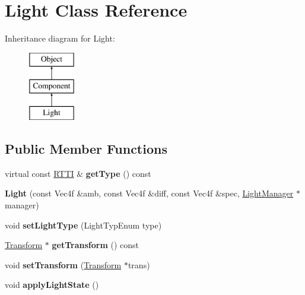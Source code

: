 \hypertarget{class_light}{
\section{Light Class Reference}
\label{class_light}
}
Inheritance diagram for Light:\begin{figure}[H]
\begin{center}
\leavevmode
\includegraphics[height=3.000000cm]{class_light}
\end{center}
\end{figure}
\subsection*{Public Member Functions}
\begin{DoxyCompactItemize}
\item 
\hypertarget{class_light_a5404d9b1ee53f91da443c061b98a8f66}{
virtual const \hyperlink{class_r_t_t_i}{RTTI} \& {\bfseries getType} () const }
\label{class_light_a5404d9b1ee53f91da443c061b98a8f66}

\item 
\hypertarget{class_light_af5c65ad5f3237bea9f6f469eb95a66a1}{
{\bfseries Light} (const Vec4f \&amb, const Vec4f \&diff, const Vec4f \&spec, \hyperlink{class_light_manager}{LightManager} $\ast$manager)}
\label{class_light_af5c65ad5f3237bea9f6f469eb95a66a1}

\item 
\hypertarget{class_light_a45f84b6f75a0d02760d3a20efaf8f83e}{
void {\bfseries setLightType} (LightTypEnum type)}
\label{class_light_a45f84b6f75a0d02760d3a20efaf8f83e}

\item 
\hypertarget{class_light_a26ececa9d5a86203fc5cd0dfa74d76b7}{
\hyperlink{class_transform}{Transform} $\ast$ {\bfseries getTransform} () const }
\label{class_light_a26ececa9d5a86203fc5cd0dfa74d76b7}

\item 
\hypertarget{class_light_a03628bf455079a5efd55d3b2b650ff9a}{
void {\bfseries setTransform} (\hyperlink{class_transform}{Transform} $\ast$trans)}
\label{class_light_a03628bf455079a5efd55d3b2b650ff9a}

\item 
\hypertarget{class_light_a0136c2fa693d47f86c51e643b9c0a6ee}{
void {\bfseries applyLightState} ()}
\label{class_light_a0136c2fa693d47f86c51e643b9c0a6ee}

\end{DoxyCompactItemize}
